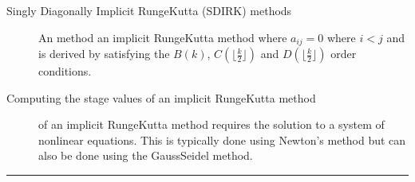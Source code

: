 \documentclass[letterpaper,10pt,english]{jupyterBook}
\begin{document}
\begin{description}
\item[{Singly Diagonally Implicit Runge\sphinxhyphen{}Kutta (SDIRK) methods\label{\detokenize{8_Appendices/8.0_Cheat_sheet:term-Singly-Diagonally-Implicit-Runge-Kutta-SDIRK-methods}}}] \leavevmode
\sphinxAtStartPar
An {\hyperref[\detokenize{3_IRKs/3.1_Deriving_IRK_methods:sdirk-derivation}]{}} method an implicit Runge\sphinxhyphen{}Kutta method where \(a_{ij} = 0\) where \(i < j\) and is derived by satisfying the \(B(k)\), \(C(\lfloor \frac{k}{2} \rfloor)\) and \(D(\lfloor \frac{k}{2} \rfloor)\) order conditions.

\item[{Computing the stage values of an implicit Runge\sphinxhyphen{}Kutta method\label{\detokenize{8_Appendices/8.0_Cheat_sheet:term-Computing-the-stage-values-of-an-implicit-Runge-Kutta-method}}}] \leavevmode
\sphinxAtStartPar
{\hyperref[\detokenize{3_IRKs/3.2_Solving_IVPs_using_IRK_methods:solving-ivps-using-irk-methods-section}]{}} of an implicit Runge\sphinxhyphen{}Kutta method requires the solution to a system of nonlinear equations. This is typically done using Newton’s method but can also be done using the Gauss\sphinxhyphen{}Seidel method.

\end{description}


\bigskip\hrule\bigskip
\end{document}
